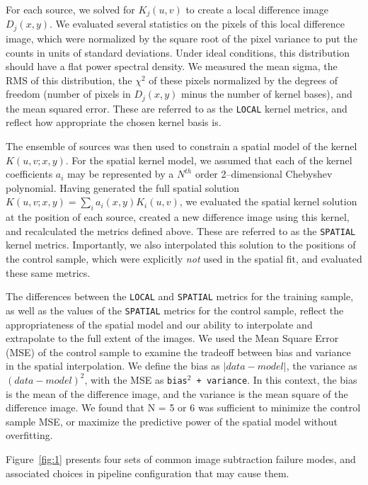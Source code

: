 \documentclass[floatfix, apj]{emulateapj}
\begin{document}
For each source, we solved for $K_j(u,v)$ to create a local difference image $D_j(x,y)$.
We evaluated several statistics on the pixels of this local difference image, which were normalized by the square root of the pixel variance to put the counts in units of standard deviations.
Under ideal conditions, this distribution should have a flat power spectral density.
We measured the mean sigma, the RMS of this distribution, the $\chi^2$ of these pixels normalized by the degrees of freedom (number of pixels in $D_j(x,y)$ minus the number of kernel bases), and the mean squared error.
These are referred to as the {\tt LOCAL} kernel metrics, and reflect how appropriate the chosen kernel basis is.

The ensemble of sources was then used to constrain a spatial model of the kernel $K(u,v;x,y)$.
For the spatial kernel model, we assumed that each of the kernel coefficients $a_i$ may be represented by a $N^{th}$ order 2--dimensional Chebyshev polynomial.
Having generated the full spatial solution $K(u,v;x,y) = \sum_i a_i(x,y) K_i(u,v)$, we evaluated the spatial kernel solution at the position of each source, created a new difference image using this kernel, and recalculated the metrics defined above.
These are referred to as the {\tt SPATIAL} kernel metrics.
Importantly, we also interpolated this solution to the positions of the control sample, which were explicitly {\it not} used in the spatial fit, and evaluated these same metrics.

The differences between the {\tt LOCAL} and {\tt SPATIAL} metrics for the training sample, as well as the values of the {\tt SPATIAL} metrics for the control sample, reflect the appropriateness of the spatial model and our ability to interpolate and extrapolate to the full extent of the images.
We used the Mean Square Error (MSE) of the control sample to examine the tradeoff between bias and variance in the spatial interpolation.
We define the bias as $\left| data - model \right|$, the variance as $(data - model)^2$, with the MSE as {\tt bias$^2$ + variance}.  
In this context, the bias is the mean of the difference image, and the variance is the mean square of the difference image.
We found that N = 5 or 6 was sufficient to minimize the control sample MSE, or maximize the predictive power of the spatial model without overfitting.

Figure~\ref{fig:1} presents four sets of common image subtraction failure modes, and associated choices in pipeline configuration that may cause them.
\end{document}

